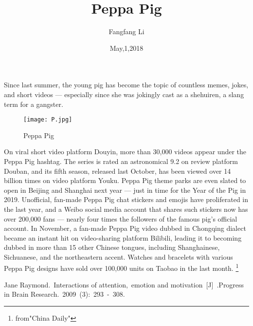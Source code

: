 \documentclass{article}
\author{Fangfang Li}
\date{May,1,2018}
\title{Peppa Pig}
\begin{document}
\maketitle
Since last summer, the young pig has become the topic of countless memes, jokes, and short videos — especially since she was jokingly cast as a shehuiren, a slang term for a gangster.
\begin{figure}[htbp]
\centering
\texttt{[image: P.jpg]}
\caption{Peppa Pig}
\label{1}
\end{figure}
\par On viral short video platform Douyin, more than 30,000 videos appear under the Peppa Pig hashtag. The series is rated an astronomical 9.2 on review platform Douban, and its fifth season, released last October, has been viewed over 14 billion times on video platform Youku. Peppa Pig theme parks are even slated to open in Beijing and Shanghai next year — just in time for the Year of the Pig in 2019. Unofficial, fan-made Peppa Pig chat stickers and emojis have proliferated in the last year, and a Weibo social media account that shares such stickers now has over 200,000 fans — nearly four times the followers of the famous pig’s official account. In November, a fan-made Peppa Pig video dubbed in Chongqing dialect became an instant hit on video-sharing platform Bilibili, leading it to becoming dubbed in more than 15 other Chinese tongues, including Shanghainese, Sichuanese, and the northeastern accent. Watches and bracelets with various Peppa Pig designs have sold over 100,000 units on Taobao in the last month.
%
\footnote{from"China Daily"}
\begin{thebibliography}{99}
Jane Raymond.~Interactions of attention,~emotion and motivation~[J]~.Progress in Brain Research.~2009~(3):~293~-~308.
\end{thebibliography}
\end{document}
